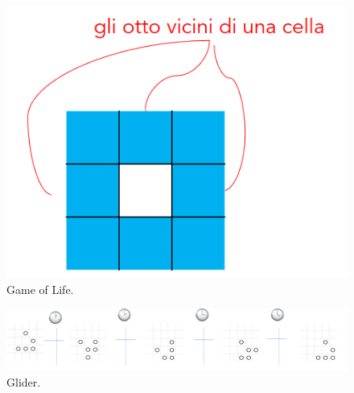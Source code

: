 \begin{figure}[h]
    \centering
    \includegraphics[scale = 0.3]{images/Conway.png}
    \caption{Game of Life.}
\end{figure}


\begin{figure}[h]
    \centering
    \includegraphics[scale = 0.3]{images/Glider.png}
    \caption{Glider.}
\end{figure}
